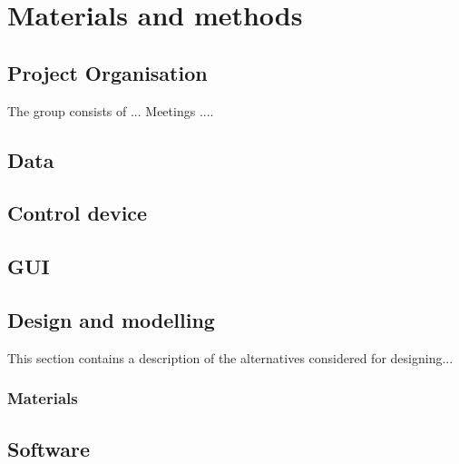 \chapter[Method]{Materials and methods}



\section{Project Organisation}
The group consists of ...
Meetings ....
\section{Data}

\section{Control device}

\section{GUI}


\break
\section{Design and modelling}
This section contains a description of the alternatives considered for designing...

\subsection{Materials}

\section{Software}
